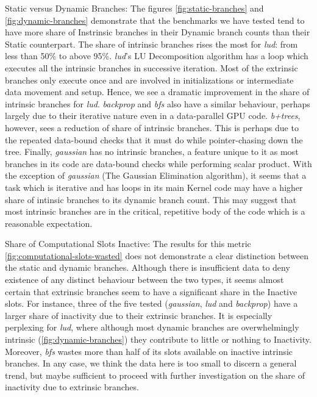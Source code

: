 

\label{sec:discussion}
\par{Static versus Dynamic Branches: The figures \ref{fig:static-branches} and \ref{fig:dynamic-branches} demonstrate that the benchmarks we have
tested tend to have more share of Instrinsic branches in their Dynamic branch counts than their Static counterpart. The share of intrinsic branches rises the most for \textsl{lud}: from less than 50\% to above 95\%. \textsl{lud}'s LU Decomposition algorithm has a loop which executes all the intrinsic branches in successive iteration. Most of the extrinsic branches only execute once and are involved in initializations or intermediate data movement and setup. Hence, we see a dramatic improvement in the share of intrinsic branches for \textsl{lud}. \textsl{backprop} and \textsl{bfs} also have a similar behaviour, perhaps largely due to their iterative nature even in a data-parallel GPU code. \textsl{b+trees}, however, sees a reduction of share of intrinsic branches. This is perhaps due to the repeated data-bound checks that it must do while pointer-chasing down the tree. Finally, \textsl{gaussian} has no intrinsic branches, a feature unique to it as most branches in its code are data-bound checks while performing scalar product. With the exception of \textsl{gaussian} (The Gaussian Elimination algorithm), it seems that a task which is iterative and has loops in its main Kernel code may have a higher share of intinsic branches to its dynamic branch count. This may suggest that most intrinsic branches are in the critical, repetitive body of the code which is a reasonable expectation.}

\par{Share of Computational Slots Inactive: The results for this metric \ref{fig:computational-slots-wasted} does not demonstrate a clear distinction between the static and dynamic branches. Although there is insufficient data to deny existence of any distinct behaviour between the two types, it seems almost certain that extrinsic branches seem to have a significant share in the Inactive slots. For instance, three of the five tested (\textsl{gaussian}, \textsl{lud} and \textsl{backprop}) have a larger share of inactivity due to their extrinsic branches. It is especially perplexing for \textsl{lud}, where although most dynamic branches are overwhelmingly intrinsic (\ref{fig:dynamic-branches}) they contribute to little or nothing to Inactivity. Moreover, \textsl{bfs} wastes more than half of its slots available on inactive intrinsic branches. In any case, we think the data here is too small to discern a general trend, but maybe sufficient to proceed with further investigation on the share of inactivity due to extrinsic branches.
}

